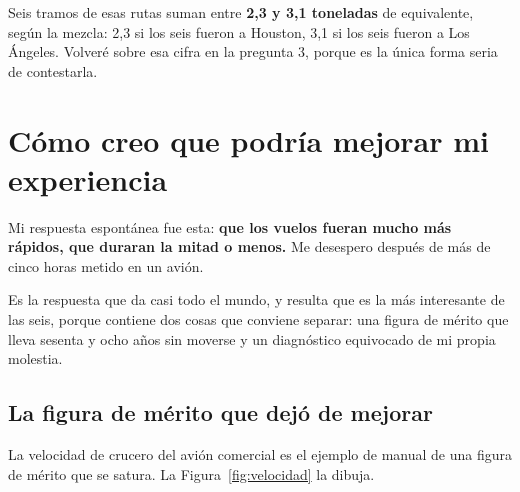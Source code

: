 \documentclass[11pt,letterpaper]{article}
\begin{document}
Seis tramos de esas rutas suman entre \textbf{2,3 y 3,1 toneladas} de 
equivalente, según la mezcla: 2,3 si los seis fueron a Houston, 3,1 si los seis
fueron a Los Ángeles. Volveré sobre esa cifra en la pregunta 3, porque es la
única forma seria de contestarla.

\section{Cómo creo que podría mejorar mi experiencia}
\label{sec:velocidad}

Mi respuesta espontánea fue esta: \textbf{que los vuelos fueran mucho más
rápidos, que duraran la mitad o menos.} Me desespero después de más de cinco
horas metido en un avión.

Es la respuesta que da casi todo el mundo, y resulta que es la más interesante
de las seis, porque contiene dos cosas que conviene separar: una figura de
mérito que lleva sesenta y ocho años sin moverse y un diagnóstico equivocado de
mi propia molestia.

\subsection{La figura de mérito que dejó de mejorar}

La velocidad de crucero del avión comercial es el ejemplo de manual de una
figura de mérito que se satura. La Figura~\ref{fig:velocidad} la dibuja.
\end{document}
